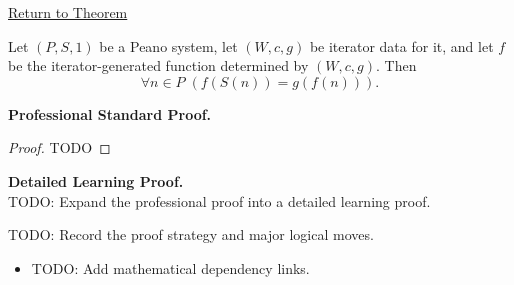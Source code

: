 \newpage
{}
\label{prf:iterator-successor-step}

\begin{remark*}[Return]
\hyperref[thm:iterator-successor-step]{Return to Theorem}
\end{remark*}

\begin{theorem*}
Let $(P,S,1)$ be a Peano system, let $(W,c,g)$ be iterator data for it, and let
$f$ be the iterator-generated function determined by $(W,c,g)$. Then
\[
\forall n\in P\;(f(S(n))=g(f(n))).
\]
\end{theorem*}

\textbf{Professional Standard Proof.}~\\
\begin{proof}
TODO
\end{proof}

\textbf{Detailed Learning Proof.}~\\
TODO: Expand the professional proof into a detailed learning proof.

\begin{remark*}
TODO: Record the proof strategy and major logical moves.
\end{remark*}

\begin{dependencies}
\begin{itemize}
  \item TODO: Add mathematical dependency links.
\end{itemize}
\end{dependencies}
